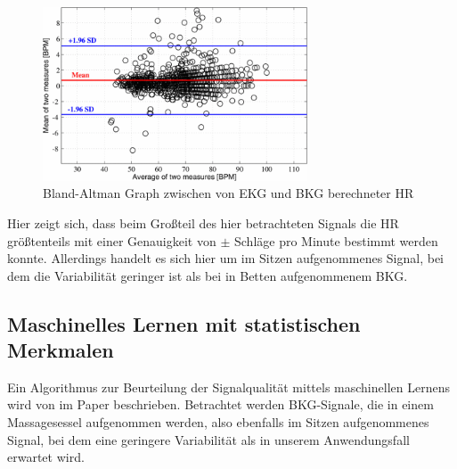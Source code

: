 	\begin{figure}[H]
		\centering
		\includegraphics[width=0.7\textwidth]{pic/bland-altman-pino.png}
		\caption[Bland-Altman Graph zwischen von \ac{EKG} und \ac{BKG} berechneter \ac{HR}]{Bland-Altman Graph zwischen von \ac{EKG} und \ac{BKG} berechneter \ac{HR}}
		\label{fig:bland-altman-pino}
	\end{figure}
	
	Hier zeigt sich, dass beim Großteil des hier betrachteten Signals die \ac{HR} größtenteils mit einer Genauigkeit von $\pm$ Schläge pro Minute bestimmt werden konnte. Allerdings handelt es sich hier um im Sitzen aufgenommenes Signal, bei dem die Variabilität geringer ist als bei in Betten aufgenommenem \ac{BKG}.
	
	
	\subsection{Maschinelles Lernen mit statistischen Merkmalen}
	
	Ein Algorithmus zur Beurteilung der Signalqualität mittels maschinellen Lernens wird von \citeauthor{Sadek2016} im Paper  beschrieben. Betrachtet werden \ac{BKG}-Signale, die in einem Massagesessel aufgenommen werden, also ebenfalls im Sitzen aufgenommenes Signal, bei dem eine geringere Variabilität als in unserem Anwendungsfall erwartet wird.
	
